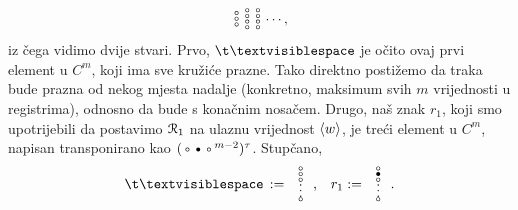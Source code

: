\begin{equation}
\begin{array}{@{}c@{}}
    \text\textopenbullet\\
    \text\textopenbullet\\
    \text\textopenbullet
    \end{array}
    \begin{array}{@{}c@{}}
    \text\textopenbullet\\
    \text\textopenbullet\\
    \text\textopenbullet\\
    \text\textopenbullet
    \end{array}
    \begin{array}{@{}c@{}}
    \text\textopenbullet\\
    \text\textopenbullet\\
    \text\textopenbullet\\
    \text\textopenbullet
    \end{array}\dotsm\text,
\end{equation}
iz čega vidimo dvije stvari. Prvo, $\bl$ je očito ovaj prvi element u $C^m$, koji ima sve kružiće prazne. Tako direktno postižemo da traka bude prazna od nekog mjesta nadalje (konkretno, maksimum svih $m$ vrijednosti u registrima), odnosno da bude s konačnim nosačem. Drugo, naš znak $r_1$, koji smo upotrijebili da postavimo $\mathcal R_{1}$ na ulaznu vrijednost $\langle w\rangle$, je treći element u $C^m$, napisan transponirano kao $(\text{\textopenbullet\textbullet\textopenbullet}^{m-2})^\tau$. Stupčano,
\begin{equation}
\renewcommand{\arraystretch}{0.1}
    \bl\,:=\begin{array}{c}
    \text\textopenbullet\\
    \text\textopenbullet\\
    \text\textopenbullet\\
    \MTFlushSpaceAbove
    \vdotswithin{\text\textopenbullet}\\
    \text\textopenbullet
    \end{array}\text{,\quad}
    r_1:=\begin{array}{c}
    \text\textopenbullet\\
    \text\textbullet\\
    \text\textopenbullet\\
    \MTFlushSpaceAbove
    \vdotswithin{\text\textopenbullet}\\
    \text\textopenbullet
    \end{array}\text.
\end{equation}

